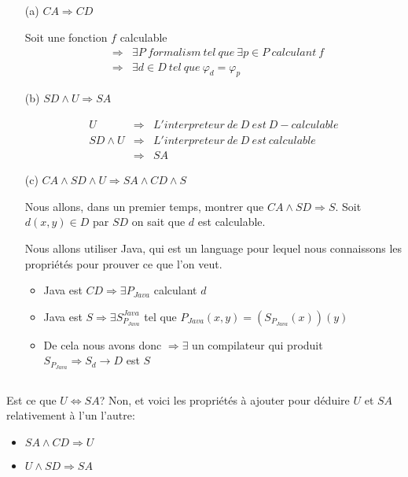\subsection{}
\begin{itemize}
\item[(a)] $CA \Rightarrow CD$

Soit une fonction $f$ calculable 
\begin{eqnarray*}
&\Rightarrow& \exists P\ formalism\ tel\ que\ \exists p \in P\ calculant\ f\\
&\Rightarrow& \exists d\in D\ tel\ que\ \varphi_d=\varphi_p
\end{eqnarray*}

\item[(b)] $SD \land U \Rightarrow SA$

\begin{eqnarray*}
U &\Rightarrow& L'interpreteur\ de\ D\ est\ D-calculable\\
SD \land U &\Rightarrow& L'interpreteur\ de\ D\ est\ calculable\\
&\Rightarrow& SA
\end{eqnarray*}

\item[(c)] $CA \land SD \land U \Rightarrow SA \land CD \land S$

Nous allons, dans un premier temps, montrer que $CA \land SD \Rightarrow S$. Soit $d(x,y) \in D$ par $SD$ on sait que $d$ est calculable. 

Nous allons utiliser Java, qui est un language pour lequel nous connaissons les propriétés pour prouver ce que l'on veut.

\begin{itemize}
	\item Java est $CD \Rightarrow \exists P_{Java}$ calculant $d$
	\item Java est $S \Rightarrow \exists S^{Java}_{P_{Java}}$ tel que $P_{Java}(x,y) = (S_{P_{Java}}(x))(y)$
	\item De cela nous avons donc $\Rightarrow \exists$ un compilateur qui produit $S_{P_{Java}} \Rightarrow S_d \rightarrow D$ est $S$
\end{itemize}
\end{itemize}

\subsection{}

Est ce que $U \Leftrightarrow SA$? Non, et voici les propriétés à ajouter pour déduire $U$ et $SA$ relativement à l'un l'autre:
\begin{itemize}
	\item $SA \land CD \Rightarrow U$
	\item $U \land SD \Rightarrow SA$
\end{itemize}

